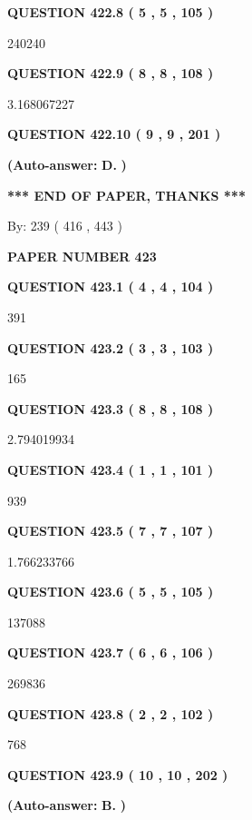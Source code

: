 \documentclass{ctexart}
\begin{document}
  
{\textbf{\large{QUESTION
422.8 
 ( 5 , 5 , 105 )
}}}

240240
  
  
{\textbf{\large{QUESTION
422.9 
 ( 8 , 8 , 108 )
}}}

3.168067227
  
  
{\textbf{\large{QUESTION
422.10 
 ( 9 , 9 , 201 )
}}}
 
 
{\textbf{(Auto-answer:}}
{\textbf{\large{
D.}}}
{\textbf{)}}
 
 
   
   
   
   
\vspace{1.0in} 
{\textbf{\large{ *** END OF PAPER, THANKS *** }}} 
   
   
\hspace{1.0in} By: 
 239 ( 416 ,  443 )
   
   
   
   
\newpage 
\setcounter{page}{ 
   423001 } 
   
   
 {\textbf{ \Large{ PAPER NUMBER  423  }}}
   
   
   
   
  
  
{\textbf{\large{QUESTION
423.1 
 ( 4 , 4 , 104 )
}}}

391
  
  
{\textbf{\large{QUESTION
423.2 
 ( 3 , 3 , 103 )
}}}

165
  
  
{\textbf{\large{QUESTION
423.3 
 ( 8 , 8 , 108 )
}}}

2.794019934
  
  
{\textbf{\large{QUESTION
423.4 
 ( 1 , 1 , 101 )
}}}

939
  
  
{\textbf{\large{QUESTION
423.5 
 ( 7 , 7 , 107 )
}}}

1.766233766
  
  
{\textbf{\large{QUESTION
423.6 
 ( 5 , 5 , 105 )
}}}

137088
  
  
{\textbf{\large{QUESTION
423.7 
 ( 6 , 6 , 106 )
}}}

269836
  
  
{\textbf{\large{QUESTION
423.8 
 ( 2 , 2 , 102 )
}}}

768
  
  
{\textbf{\large{QUESTION
423.9 
 ( 10 , 10 , 202 )
}}}
 
 
{\textbf{(Auto-answer:}}
{\textbf{\large{
B.}}}
{\textbf{)}}
 
 
  
\end{document}
